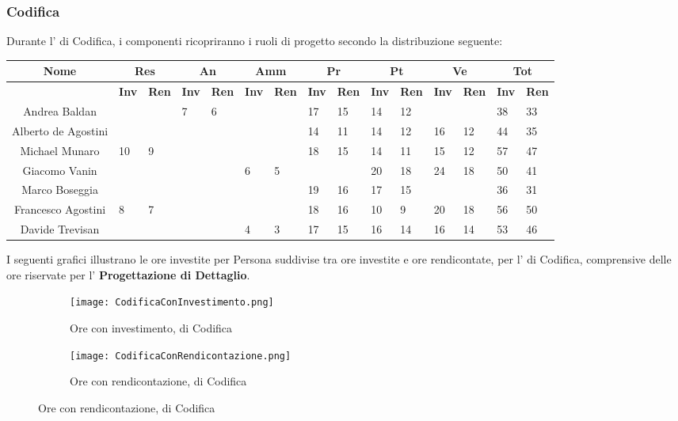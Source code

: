 \documentclass{scalatekids-article}
\begin{document}
\subsubsection{Codifica}
Durante l' di Codifica, i componenti ricopriranno i ruoli di progetto secondo la distribuzione seguente:
\begin{center}
  \scriptsize
  \begin{tabular}{| c | p{0.35cm}  p{0.35cm} | p{0.35cm}  p{0.35cm} | p{0.35cm}  p{0.35cm} | p{0.35cm}  p{0.35cm} | p{0.35cm}  p{0.35cm} | p{0.35cm}  p{0.35cm} | p{0.35cm}  p{0.35cm} |}
    \hline
    \textbf{Nome} & \multicolumn{2}{|c|}{\textbf{Res}} & \multicolumn{2}{|c|}{\textbf{An}} & \multicolumn{2}{|c|}{\textbf{Amm}} & \multicolumn{2}{|c|}{\textbf{Pr}} & \multicolumn{2}{|c|}{\textbf{Pt}} & \multicolumn{2}{|c|}{\textbf{Ve}} & \multicolumn{2}{|c|}{\textbf{Tot}}\\
    \hline
    & \textbf{Inv} & \textbf{Ren} & \textbf{Inv} & \textbf{Ren} & \textbf{Inv} & \textbf{Ren} & \textbf{Inv} & \textbf{Ren} & \textbf{Inv} & \textbf{Ren} & \textbf{Inv} & \textbf{Ren} & \textbf{Inv} & \textbf{Ren}\\
    \hline
    Andrea Baldan & & & 7 & 6 & & & 17 & 15 & 14 & 12 & & & 38 & 33\\
    Alberto de Agostini & & & & & & & 14 & 11 & 14 & 12 & 16 & 12 & 44 & 35\\
    Michael Munaro & 10 & 9 & & & & & 18 & 15 & 14 & 11 & 15 & 12 & 57 & 47\\
    Giacomo Vanin & & & & & 6 & 5 & & & 20 & 18 & 24 & 18 & 50 & 41\\
    Marco Boseggia & & & & & & & 19 & 16 & 17 & 15 & & & 36 & 31\\
    Francesco Agostini & 8 & 7 & & & & & 18 & 16 & 10 & 9 & 20 & 18 & 56 & 50\\
    Davide Trevisan & & & & & 4 & 3 & 17 & 15 & 16 & 14 & 16 & 14 & 53 & 46\\
    \hline
  \end{tabular}
\end{center}
\normalsize I seguenti grafici illustrano le ore investite per Persona suddivise
tra ore investite e ore rendicontate, per l' di Codifica, comprensive
delle ore riservate per l' \textbf{Progettazione di Dettaglio}.
\begin{figure}[H]
  \begin{subfigure}[H]{0.47\textwidth}
    \texttt{[image: CodificaConInvestimento.png]}
    \caption{Ore con investimento,  di Codifica}
  \end{subfigure}
  \qquad
  \begin{subfigure}[H]{0.47\textwidth}
    \texttt{[image: CodificaConRendicontazione.png]}
    \caption{Ore con rendicontazione,  di Codifica}
  \end{subfigure}
\end{figure}
\end{document}
